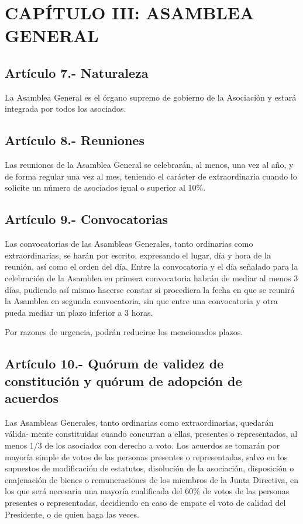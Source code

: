 \documentclass[10pt, spanish, pdftex]{gulplantilla}
\begin{document}
\section{CAPÍTULO III: ASAMBLEA GENERAL}

\subsection{Artículo 7.- Naturaleza}
La Asamblea General es el órgano supremo de gobierno de la Asociación y estará integrada por todos los asociados.

\subsection{Artículo 8.- Reuniones}
Las reuniones de la Asamblea General se celebrarán, al menos, una vez al año, y de forma regular una vez al mes, teniendo el carácter de extraordinaria cuando lo solicite un número de asociados igual o superior al 10\%.

\subsection{Artículo 9.- Convocatorias}
Las convocatorias de las Asambleas Generales, tanto ordinarias como extraordinarias, se harán por escrito, expresando el lugar, día y hora de la reunión, así como el orden del día. Entre la convocatoria y el día señalado para la celebración de la Asamblea en primera convocatoria habrán de mediar al menos 3 días, pudiendo así mismo hacerse constar si procediera la fecha en que se reunirá la Asamblea en segunda convocatoria, sin que entre una convocatoria y otra pueda mediar un plazo inferior a 3 horas.

Por razones de urgencia, podrán reducirse los mencionados plazos.

\subsection{Artículo 10.- Quórum de validez de constitución y quórum de adopción de acuerdos}
Las Asambleas Generales, tanto ordinarias como extraordinarias, quedarán válida- mente constituidas cuando concurran a ellas, presentes o representados, al menos 1/3 de los asociados con derecho a voto. Los acuerdos se tomarán por mayoría simple de votos de las personas presentes o representadas, salvo en los supuestos de modificación de estatutos, disolución de la asociación, disposición o enajenación de bienes o remuneraciones de los miembros de la Junta Directiva, en los que será necesaria una mayoría cualificada del 60\% de votos de las personas presentes o representadas, decidiendo en caso de empate el voto de calidad del Presidente, o de quien haga las veces.
\end{document}
